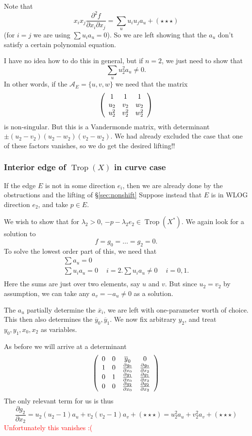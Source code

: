 \documentclass[oneside]{amsart}
\newcommand{\A}{\mathcal{A}}
\newcommand{\HOT}{(\star\star\star)}
\DeclareMathOperator{\trop}{Trop}
\theoremstyle{definition}
\newcommand{\nathan}[1]{\textcolor{red}{#1}}
\begin{document}
Note that
\[
x_ix_j\frac{\partial^2 f}{\partial x_i\partial x_j}=
\sum_u u_iu_j a_u+\HOT  
\]
(for $i=j$ we are using $\sum u_ia_u=0$).
So we are left showing that the $a_u$ don't satisfy a certain polynomial equation.


I have no idea how to do this in general, but if $n=2$, we just need to show that 
\[
\sum_u u_2^2a_u\neq 0.
\]
In other words, if the $\A_E=\{u,v,w\}$ we need that the matrix 
\[
\left(\begin{array}{c c c}
1&1&1\\
u_2&v_2&w_2\\
u_2^2& v_2^2& w_2^2
\end{array}\right)
\]
is non-singular. But this is a Vandermonde matrix, with determinant $\pm (u_2-v_2)(u_2-w_2)(v_2-w_2)$. We had already excluded the case that one of these factors vanishes, so we do get the desired lifting!!

\subsubsection{Interior edge of $\trop(X)$ in curve case}
If the edge $E$ is not in some direction $e_i$, then we are already done by the obstructions and the lifting of \S\ref{sec:nonshift}
Suppose instead that $E$ is in WLOG direction $e_2$, and take $p\in E$. 

We wish to show that for $\lambda_2>0$, $-p- \lambda_2 e_2\in\trop(X^*)$. We again look for a solution to 
\[f=g_0=\ldots=g_2=0.\]
To solve the lowest order part of this, we need that
\begin{align*}
\sum a_u=0\\
\sum u_i a_u = 0\ \quad i=2.
\sum u_i a_u \neq  0\ \quad i=0,1.\\
\end{align*}
Here the sums are just over two elements, say $u$ and $v$.  But since $u_2=v_2$ by assumption, we can take any $a_v=-a_u\neq 0$ as a solution. 

The $a_u$ partially determine the $\overline{x}_i$, we are left with one-parameter worth of choice. This then also determines the $\overline{y}_0,\overline{y}_1$. We now fix arbitrary $y_2$, and treat $y_0,y_1,x_0,x_2$ as variables.

As before we will arrive at a determinant
\[
\left(
\begin{array}{c c c c }
0 &  0 &  \overline{y}_0  & 0 \\
1 &  0 &  \frac{\partial g_0}{\partial x_0}  & \frac{\partial g_0}{\partial x_2} \\
0 &  1 &  \frac{\partial g_1}{\partial x_0}  & \frac{\partial g_1}{\partial x_2} \\

0 &  0 &  \frac{\partial g_2}{\partial x_0}  & \frac{\partial g_2}{\partial x_2} \\
\end{array}
\right)
\]
The only relevant term for us is thus 
\[\frac{\partial g_2}{\partial x_2} 
=u_2(u_2-1)a_u+v_2(v_2-1)a_v+\HOT
=u_2^2a_u+v_2^2a_v+\HOT
\]
\nathan{Unfortunately this vanishes :(}
\end{document}
